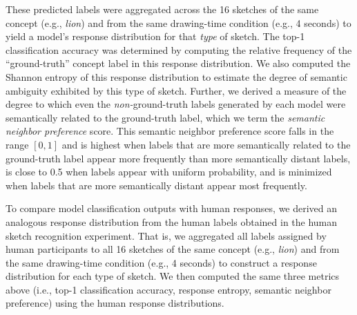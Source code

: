 \documentclass{article}
\begin{document}
These predicted labels were aggregated across the 16 sketches of the same concept (e.g., \textit{lion}) and from the same drawing-time condition (e.g., 4 seconds) to yield a model's response distribution for that \textit{type} of sketch.
The top-1 classification accuracy was determined by computing the relative frequency of the ``ground-truth'' concept label in this response distribution. 
We also computed the Shannon entropy of this response distribution to estimate the degree of semantic ambiguity exhibited by this type of sketch.
Further, we derived a measure of the degree to which even the \textit{non-}ground-truth labels generated by each model were semantically related to the ground-truth label, which we term the \textit{semantic neighbor preference} score.
This semantic neighbor preference score falls in the range $[0,1]$ and is highest when labels that are more semantically related to the ground-truth label appear more frequently than more semantically distant labels, is close to 0.5 when labels appear with uniform probability, and is minimized when labels that are more semantically distant appear most frequently. 

To compare model classification outputs with human responses, we derived an analogous response distribution from the human labels obtained in the human sketch recognition experiment. 
That is, we aggregated all labels assigned by human participants to all 16 sketches of the same concept (e.g., \textit{lion}) and from the same drawing-time condition (e.g., 4 seconds) to construct a response distribution for each type of sketch. 
We then computed the same three metrics above (i.e., top-1 classification accuracy, response entropy, semantic neighbor preference) using the human response distributions. 

\end{document}
